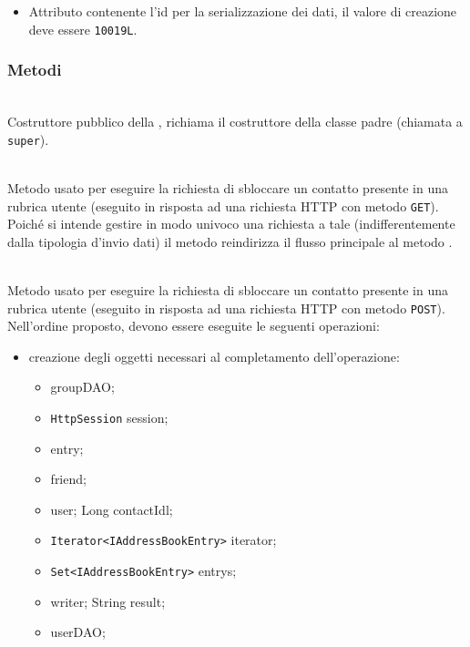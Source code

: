 \begin{itemize}
	\item{}
	Attributo contenente l'id per la serializzazione dei dati, il valore di creazione deve essere \texttt{10019L}.
\end{itemize}

\subsubsection*{Metodi}

\begin{description}
	\item{}\\
	Costruttore pubblico della , richiama il costruttore della classe padre (chiamata a \texttt{super}).
	
	\item{}\\
	Metodo usato per eseguire la richiesta di sbloccare un contatto presente in una rubrica utente (eseguito in risposta ad una richiesta HTTP con metodo \texttt{GET}). Poiché si intende gestire in modo univoco una richiesta a tale  (indifferentemente dalla tipologia d'invio dati) il metodo reindirizza il flusso principale al metodo .
	
	\item{}\\	
	Metodo usato per eseguire la richiesta di sbloccare un contatto presente in una rubrica utente (eseguito in risposta ad una richiesta HTTP con metodo \texttt{POST}). Nell'ordine proposto, devono essere eseguite le seguenti operazioni:
	\begin{itemize}
		\item creazione degli oggetti necessari al completamento dell'operazione:
		\begin{itemize}
			\item {} groupDAO;
			\item \texttt{HttpSession} session;
			\item {} entry;
			\item {} friend;
			\item {} user;
			Long contactIdl;
			\item \texttt{Iterator<IAddressBookEntry>} iterator;
			\item \texttt{Set<IAddressBookEntry>} entrys;
			\item {} writer;
			String result;
			\item {} userDAO;
		\end{itemize}
		

\end{itemize}
\end{description}

